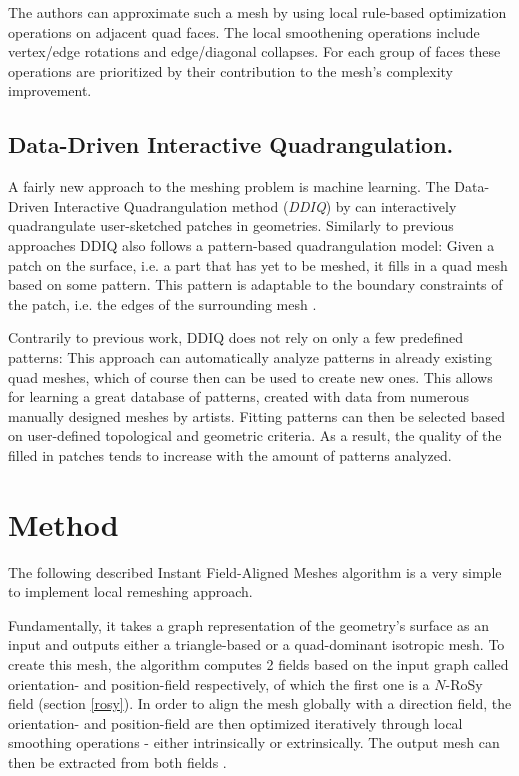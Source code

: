 \documentclass{ACGSeminar}
\begin{document}
The authors can approximate such a mesh by using local rule-based optimization operations on adjacent quad faces. The local smoothening operations include vertex/edge rotations and edge/diagonal collapses. For each group of faces these operations are prioritized by their contribution to the mesh's complexity improvement.

\subsection*{Data-Driven Interactive Quadrangulation.}\label{DDIQ}
A fairly new approach to the meshing problem is machine learning. The Data-Driven Interactive Quadrangulation method (\textit{DDIQ}) by \cite{marcias2015data} can interactively quadrangulate user-sketched patches in geometries. Similarly to previous approaches DDIQ also follows a pattern-based quadrangulation model: Given a patch on the surface, i.e. a part that has yet to be meshed, it fills in a quad mesh based on some pattern. This pattern is adaptable to the boundary constraints of the patch, i.e. the edges of the surrounding mesh \cite{marcias2015data}.

Contrarily to previous work, DDIQ does not rely on only a few predefined patterns: This approach can automatically analyze patterns in already existing quad meshes, which of course then can be used to create new ones. This allows for learning a great database of patterns, created with data from numerous manually designed meshes by artists. Fitting patterns can then be selected based on user-defined topological and geometric criteria. As a result, the quality of the filled in patches tends to increase with the amount of patterns analyzed.


\section{Method}\label{algorithm}
The following described Instant Field-Aligned Meshes algorithm is a very simple to implement local remeshing approach.

Fundamentally, it takes a graph representation of the geometry's surface as an input and outputs either a triangle-based or a quad-dominant isotropic mesh. To create this mesh, the algorithm computes 2 fields based on the input graph called orientation- and position-field respectively, of which the first one is a $N$-RoSy field (section \ref{rosy}). In order to align the mesh globally with a direction field, the orientation- and position-field are then optimized iteratively through local smoothing operations - either intrinsically or extrinsically. The output mesh can then be extracted from both fields \cite{jakob2015instant}.
\end{document}
